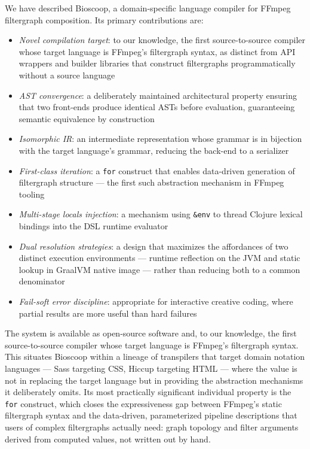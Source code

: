 \documentclass[conference]{IEEEtran}
\begin{document}
We have described Bioscoop, a domain-specific language compiler for FFmpeg filtergraph composition. Its primary contributions are:

\begin{itemize}
\item \emph{Novel compilation target}: to our knowledge, the first source-to-source compiler whose target language is FFmpeg's filtergraph syntax, as distinct from API wrappers and builder libraries that construct filtergraphs programmatically without a source language
\item \emph{AST convergence}: a deliberately maintained architectural property ensuring that two front-ends produce identical ASTs before evaluation, guaranteeing semantic equivalence by construction
\item \emph{Isomorphic IR}: an intermediate representation whose grammar is in bijection with the target language's grammar, reducing the back-end to a serializer
\item \emph{First-class iteration}: a \texttt{for} construct that enables data-driven generation of filtergraph structure --- the first such abstraction mechanism in FFmpeg tooling
\item \emph{Multi-stage locals injection}: a mechanism using \texttt{\&env} to thread Clojure lexical bindings into the DSL runtime evaluator
\item \emph{Dual resolution strategies}: a design that maximizes the affordances of two distinct execution environments --- runtime reflection on the JVM and static lookup in GraalVM native image --- rather than reducing both to a common denominator
\item \emph{Fail-soft error discipline}: appropriate for interactive creative coding, where partial results are more useful than hard failures
\end{itemize}

The system is available as open-source software and, to our knowledge, the first source-to-source compiler whose target language is FFmpeg's filtergraph syntax. This situates Bioscoop within a lineage of transpilers that target domain notation languages --- Sass targeting CSS, Hiccup targeting HTML --- where the value is not in replacing the target language but in providing the abstraction mechanisms it deliberately omits. Its most practically significant individual property is the \texttt{for} construct, which closes the expressiveness gap between FFmpeg's static filtergraph syntax and the data-driven, parameterized pipeline descriptions that users of complex filtergraphs actually need: graph topology and filter arguments derived from computed values, not written out by hand.
\end{document}
